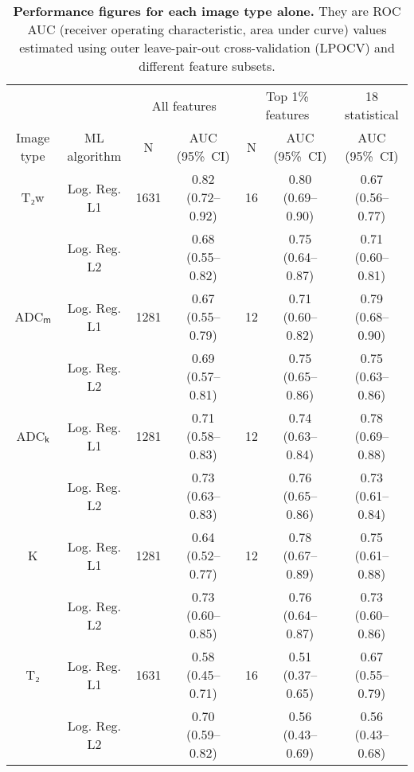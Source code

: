 \documentclass[10pt,letterpaper]{article}
\newcommand{\ci}[1]{{\small (#1)}}  %
\begin{document}
\begin{table}[!h]
\begin{adjustwidth}{-2.25in}{0in}
\centering
\caption{{\bf Performance figures for each image type alone.} They are ROC AUC
(receiver operating characteristic, area under curve) values estimated using
outer leave-pair-out cross-validation (LPOCV) and different feature subsets.}%
\label{tab:auc_imagetype}

\begin{tabular}{c c  c c  c c  c}
\hline
& & \multicolumn{2}{c}{All features} & \multicolumn{2}{c}{Top 1\% features} & 18 statistical \\
Image type & ML algorithm & N & AUC \ci{95\%~CI} & N & AUC \ci{95\%~CI} & AUC \ci{95\%~CI} \\
\hline
T₂w  & Log. Reg. L1 & 1631 & 0.82 \ci{0.72--0.92} & 16 & 0.80 \ci{0.69--0.90} & 0.67 \ci{0.56--0.77} \\
     & Log. Reg. L2 &      & 0.68 \ci{0.55--0.82} &    & 0.75 \ci{0.64--0.87} & 0.71 \ci{0.60--0.81} \\
ADCₘ & Log. Reg. L1 & 1281 & 0.67 \ci{0.55--0.79} & 12 & 0.71 \ci{0.60--0.82} & 0.79 \ci{0.68--0.90} \\
     & Log. Reg. L2 &      & 0.69 \ci{0.57--0.81} &    & 0.75 \ci{0.65--0.86} & 0.75 \ci{0.63--0.86} \\
ADCₖ & Log. Reg. L1 & 1281 & 0.71 \ci{0.58--0.83} & 12 & 0.74 \ci{0.63--0.84} & 0.78 \ci{0.69--0.88} \\
     & Log. Reg. L2 &      & 0.73 \ci{0.63--0.83} &    & 0.76 \ci{0.65--0.86} & 0.73 \ci{0.61--0.84} \\
K    & Log. Reg. L1 & 1281 & 0.64 \ci{0.52--0.77} & 12 & 0.78 \ci{0.67--0.89} & 0.75 \ci{0.61--0.88} \\
     & Log. Reg. L2 &      & 0.73 \ci{0.60--0.85} &    & 0.76 \ci{0.64--0.87} & 0.73 \ci{0.60--0.86} \\
T₂   & Log. Reg. L1 & 1631 & 0.58 \ci{0.45--0.71} & 16 & 0.51 \ci{0.37--0.65} & 0.67 \ci{0.55--0.79} \\
     & Log. Reg. L2 &      & 0.70 \ci{0.59--0.82} &    & 0.56 \ci{0.43--0.69} & 0.56 \ci{0.43--0.68} \\
\hline
\end{tabular}
\end{adjustwidth}
\end{table}
\end{document}
